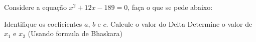 \begin{question} %
Considere a equação $x^2+12x-189=0$, faça o que se pede abaixo:
\begin{tasks}
        \task Identifique os coeficientes $a$, $b$ e $c$.
        \task Calcule o valor do Delta
        \task Determine o valor de $x_{1}$ e $x_{2}$ (Usando formula de Bhaskara)
    \end{tasks}
\end{question}